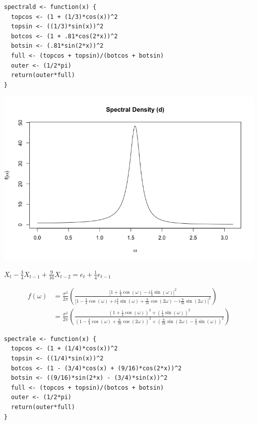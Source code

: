 \documentclass[10pt,a4paper]{exam}
\begin{document}
\begin{questions}
\begin{parts}
\begin{solution}
\begin{verbatim}
spectrald <- function(x) {
  topcos <- (1 + (1/3)*cos(x))^2
  topsin <- ((1/3)*sin(x))^2
  botcos <- (1 + .81*cos(2*x))^2
  botsin <- (.81*sin(2*x))^2
  full <- (topcos + topsin)/(botcos + botsin)
  outer <- (1/2*pi)
  return(outer*full)
}
\end{verbatim}
\begin{center}
\includegraphics[width = .9\linewidth]{1d}
\end{center}
\end{solution}



\pagebreak
\item $X_t - \frac{3}{4}X_{t-1} + \frac{9}{16}X_{t-2} = e_t + \frac{1}{4}e_{t-1}$
\begin{solution}
\begin{align*}
f(\omega)			&= \frac{\sigma^2}{2\pi} \left( \frac{\left|1 + \frac{1}{4}\cos(\omega) - i\frac{1}{4}\sin(\omega)          \right|^2}{\left|1 - \frac{3}{4}\cos(\omega) + i\frac{3}{4}\sin(\omega)  + \frac{9}{16}\cos(2\omega) - i\frac{9}{16}\sin(2\omega)        \right|^2}    \right)\\
						&= \frac{\sigma^2}{2\pi} \left( \frac{\left(1 + \frac{1}{4}\cos(\omega)\right)^2 + \left(\frac{1}{4}\sin(\omega)\right)^2}{\left(1 - \frac{3}{4}\cos(\omega) + \frac{9}{16}\cos(2\omega)\right)^2 + \left(\frac{9}{16}\sin(2\omega) - \frac{3}{4}\sin(\omega) \right)^2} \right)
\end{align*}

\begin{verbatim}
spectrale <- function(x) {
  topcos <- (1 + (1/4)*cos(x))^2
  topsin <- ((1/4)*sin(x))^2
  botcos <- (1 - (3/4)*cos(x) + (9/16)*cos(2*x))^2
  botsin <- ((9/16)*sin(2*x) - (3/4)*sin(x))^2  
  full <- (topcos + topsin)/(botcos + botsin)
  outer <- (1/2*pi)
  return(outer*full)
}
\end{verbatim}


\end{solution}
\end{parts}
\end{questions}
\end{document}
